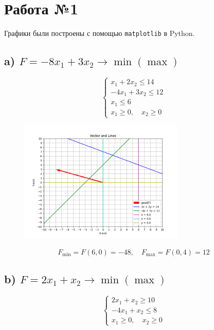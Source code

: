 \documentclass[17pt]{extarticle}
\begin{document}
\section*{Работа №1}

Графики были построены с помощью \texttt{matplotlib} в Python.

\subsection*{a) \( F = -8x_1 + 3x_2 \to \min (\max) \)}

\[
    \begin{cases}
        x_1 + 2x_2 \leq 14   \\
        -4x_1 + 3x_2 \leq 12 \\
        x_1 \leq 6           \\
        x_1 \geq 0, \quad x_2 \geq 0
    \end{cases}
\]

\begin{figure}[H]
    \centering
    \includegraphics[width=0.7\textwidth]{a.png}
\end{figure}

\[
    F_{\min} = F(6, 0) = -48, \quad F_{\max} = F(0, 4) = 12
\]

\subsection*{b) \( F = 2x_1 + x_2 \to \min (\max) \)}

\[
    \begin{cases}
        2x_1 + x_2 \geq 10 \\
        -4x_1 + x_2 \leq 8 \\
        x_1 \geq 0, \quad x_2 \geq 0
    \end{cases}
\]
\end{document}

